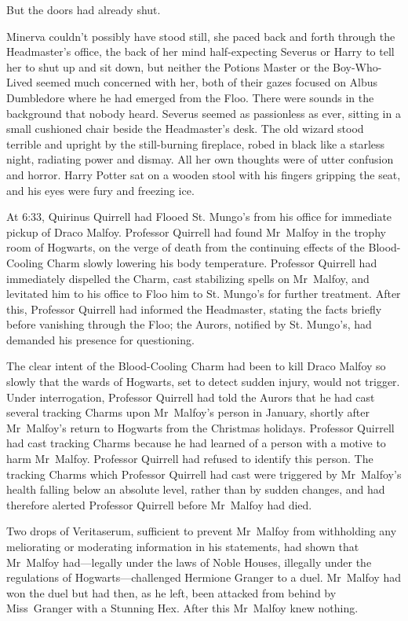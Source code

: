 But the doors had already shut.

\later

Minerva couldn't possibly have stood still, she paced back and forth through the Headmaster's office, the back of her mind half-expecting Severus or Harry to tell her to shut up and sit down, but neither the Potions Master or the Boy-Who-Lived seemed much concerned with her, both of their gazes focused on Albus Dumbledore where he had emerged from the Floo. There were sounds in the background that nobody heard. Severus seemed as passionless as ever, sitting in a small cushioned chair beside the Headmaster's desk. The old wizard stood terrible and upright by the still-burning fireplace, robed in black like a starless night, radiating power and dismay. All her own thoughts were of utter confusion and horror. Harry Potter sat on a wooden stool with his fingers gripping the seat, and his eyes were fury and freezing ice.

At 6:33\am, Quirinus Quirrell had Flooed St. Mungo's from his office for immediate pickup of Draco Malfoy. Professor Quirrell had found Mr~Malfoy in the trophy room of Hogwarts, on the verge of death from the continuing effects of the Blood-Cooling Charm slowly lowering his body temperature. Professor Quirrell had immediately dispelled the Charm, cast stabilizing spells on Mr~Malfoy, and levitated him to his office to Floo him to St. Mungo's for further treatment. After this, Professor Quirrell had informed the Headmaster, stating the facts briefly before vanishing through the Floo; the Aurors, notified by St. Mungo's, had demanded his presence for questioning.

The clear intent of the Blood-Cooling Charm had been to kill Draco Malfoy so slowly that the wards of Hogwarts, set to detect sudden injury, would not trigger. Under interrogation, Professor Quirrell had told the Aurors that he had cast several tracking Charms upon Mr~Malfoy's person in January, shortly after Mr~Malfoy's return to Hogwarts from the Christmas holidays. Professor Quirrell had cast tracking Charms because he had learned of a person with a motive to harm Mr~Malfoy. Professor Quirrell had refused to identify this person. The tracking Charms which Professor Quirrell had cast were triggered by Mr~Malfoy's health falling below an absolute level, rather than by sudden changes, and had therefore alerted Professor Quirrell before Mr~Malfoy had died.

Two drops of Veritaserum, sufficient to prevent Mr~Malfoy from withholding any meliorating or moderating information in his statements, had shown that Mr~Malfoy had—legally under the laws of Noble Houses, illegally under the regulations of Hogwarts—challenged Hermione Granger to a duel. Mr~Malfoy had won the duel but had then, as he left, been attacked from behind by Miss~Granger with a Stunning Hex. After this Mr~Malfoy knew nothing.

